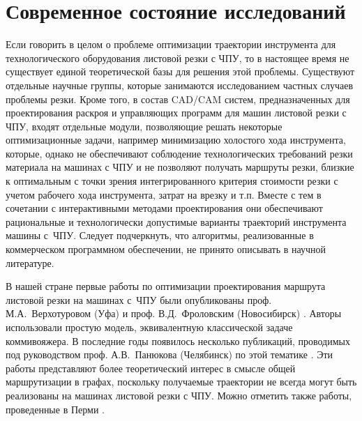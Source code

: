 
\section{Современное состояние исследований}
\label{sec:cut.refs}

Если говорить в целом о проблеме оптимизации траектории инструмента для технологического оборудования листовой
резки с ЧПУ,
то в настоящее время не существует единой теоретической базы для решения этой проблемы.
Существуют отдельные научные группы,
которые занимаются исследованием частных случаев проблемы резки.
Кроме того,
в состав CAD/CAM систем,
предназначенных для проектирования раскроя и управляющих программ для машин листовой резки с ЧПУ,
входят отдельные модули,
позволяющие решать некоторые оптимизационные задачи,
например минимизацию холостого хода инструмента,
которые, однако не обеспечивают соблюдение
технологических требований резки материала на машинах с ЧПУ
и не позволяют получать маршруты резки,
близкие к оптимальным с точки зрения интегрированного критерия стоимости резки
с учетом рабочего хода инструмента, затрат на врезку и т.п.
Вместе с тем в сочетании с интерактивными методами проектирования
они обеспечивают рациональные и технологически допустимые варианты траекторий инструмента машины с~ЧПУ.
Следует подчеркнуть, что алгоритмы,
реализованные в коммерческом программном обеспечении,
не принято описывать в научной литературе.

В нашей стране первые работы по оптимизации проектирования маршрута листовой резки на машинах с~ЧПУ
были опубликованы проф. М.А.~Верхотуровом
(Уфа)
\cite{bi:верхотуров2008,bi:верхотуров2008цепь,bi:верхотуров2020}
и проф. В.Д.~Фроловским
(Новосибирск)
\cite{bi:Ganelina,bi:пушкарева,bi:фроловский2005}.
Авторы использовали
простую модель, эквивалентную классической задаче коммивояжера.
В последние годы появилось несколько публикаций,
проводимых под руководством проф. А.В.~Панюкова
(Челябинск) по
этой тематике
\cite{bi:Makarovskikh2019Jan,Makarovskikh20181171,bi:Makarovskikh2019Other}.
Эти работы представляют более теоретический интерес
в смысле общей маршрутизации в графах,
поскольку получаемые траектории не всегда могут быть
реализованы на машинах листовой резки с ЧПУ.
Можно отметить также работы, проведенные в Перми
\cite{bi:мурзакаев2015построение,bi:мурзакаев2015применение,bi:файзрахманов2015,bi:бурылов2016}.

